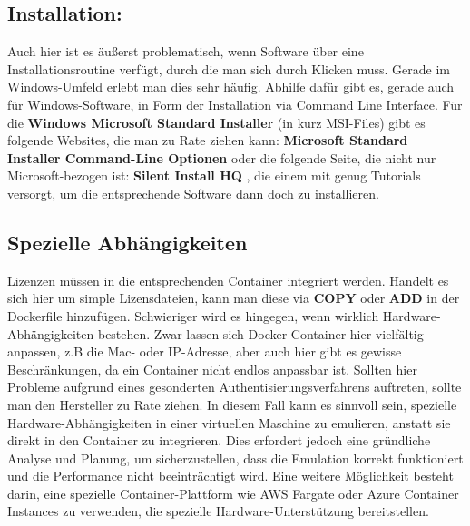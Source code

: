 \subsection{Installation:}
Auch hier ist es äußerst problematisch, wenn Software über eine Installationsroutine verfügt, durch die man sich durch Klicken muss.
Gerade im Windows-Umfeld erlebt man dies sehr häufig. Abhilfe dafür gibt es, gerade auch für Windows-Software, in Form der Installation via Command Line Interface.
Für die \textbf{Windows Microsoft Standard Installer} (in kurz MSI-Files) gibt es folgende Websites, die man zu Rate ziehen kann: \textbf{Microsoft Standard Installer Command-Line Optionen} \cite{microsoft} oder die folgende Seite, die nicht nur Microsoft-bezogen ist: \textbf{Silent Install HQ} \cite{silent}, die einem mit genug Tutorials versorgt, um die entsprechende Software dann doch zu installieren.

\subsection{Spezielle Abhängigkeiten}
Lizenzen müssen in die entsprechenden Container integriert werden. Handelt es sich hier um simple Lizensdateien, kann man diese via \textbf{COPY} oder \textbf{ADD} in der Dockerfile hinzufügen.
Schwieriger wird es hingegen, wenn wirklich Hardware-Abhängigkeiten bestehen. Zwar lassen sich Docker-Container hier vielfältig anpassen, z.B die Mac- oder IP-Adresse, aber auch hier gibt es gewisse Beschränkungen, da ein Container nicht endlos anpassbar ist.
Sollten hier Probleme aufgrund eines gesonderten Authentisierungsverfahrens auftreten, sollte man den Hersteller zu Rate ziehen. In diesem Fall kann es sinnvoll sein, spezielle Hardware-Abhängigkeiten in einer virtuellen Maschine zu emulieren, anstatt sie direkt in den Container zu integrieren.
Dies erfordert jedoch eine gründliche Analyse und Planung, um sicherzustellen, dass die Emulation korrekt funktioniert und die Performance nicht beeinträchtigt wird.
Eine weitere Möglichkeit besteht darin, eine spezielle Container-Plattform wie AWS Fargate oder Azure Container Instances zu verwenden, die spezielle Hardware-Unterstützung bereitstellen.

